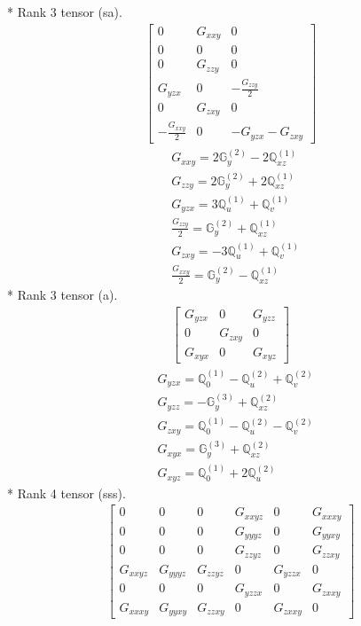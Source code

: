 \documentclass[fleqn,8pt,landscape]{jsarticle}
\begin{document}
* Rank 3 tensor (sa).
\begin{align*}
\begin{bmatrix} 0 & G_{xxy} & 0 \\ 0 & 0 & 0 \\ 0 & G_{zzy} & 0 \\ G_{yzx} & 0 & - \frac{G_{zzy}}{2} \\ 0 & G_{zxy} & 0 \\ - \frac{G_{xxy}}{2} & 0 & - G_{yzx} - G_{zxy} \end{bmatrix}
\end{align*}
\begin{align*}
& G_{xxy} = 2 \mathbb{G}_{y}^{(2)} - 2 \mathbb{Q}_{xz}^{(1)} \\
& G_{zzy} = 2 \mathbb{G}_{y}^{(2)} + 2 \mathbb{Q}_{xz}^{(1)} \\
& G_{yzx} = 3 \mathbb{Q}_{u}^{(1)} + \mathbb{Q}_{v}^{(1)} \\
& \frac{G_{zzy}}{2} = \mathbb{G}_{y}^{(2)} + \mathbb{Q}_{xz}^{(1)} \\
& G_{zxy} = - 3 \mathbb{Q}_{u}^{(1)} + \mathbb{Q}_{v}^{(1)} \\
& \frac{G_{xxy}}{2} = \mathbb{G}_{y}^{(2)} - \mathbb{Q}_{xz}^{(1)}
\end{align*}
* Rank 3 tensor (a).
\begin{align*}
\begin{bmatrix} G_{yzx} & 0 & G_{yzz} \\ 0 & G_{zxy} & 0 \\ G_{xyx} & 0 & G_{xyz} \end{bmatrix}
\end{align*}
\begin{align*}
& G_{yzx} = \mathbb{Q}_{0}^{(1)} - \mathbb{Q}_{u}^{(2)} + \mathbb{Q}_{v}^{(2)} \\
& G_{yzz} = - \mathbb{G}_{y}^{(3)} + \mathbb{Q}_{xz}^{(2)} \\
& G_{zxy} = \mathbb{Q}_{0}^{(1)} - \mathbb{Q}_{u}^{(2)} - \mathbb{Q}_{v}^{(2)} \\
& G_{xyx} = \mathbb{G}_{y}^{(3)} + \mathbb{Q}_{xz}^{(2)} \\
& G_{xyz} = \mathbb{Q}_{0}^{(1)} + 2 \mathbb{Q}_{u}^{(2)}
\end{align*}
* Rank 4 tensor (sss).
\begin{align*}
\begin{bmatrix} 0 & 0 & 0 & G_{xxyz} & 0 & G_{xxxy} \\ 0 & 0 & 0 & G_{yyyz} & 0 & G_{yyxy} \\ 0 & 0 & 0 & G_{zzyz} & 0 & G_{zzxy} \\ G_{xxyz} & G_{yyyz} & G_{zzyz} & 0 & G_{yzzx} & 0 \\ 0 & 0 & 0 & G_{yzzx} & 0 & G_{zxxy} \\ G_{xxxy} & G_{yyxy} & G_{zzxy} & 0 & G_{zxxy} & 0 \end{bmatrix}
\end{align*}
\end{document}
